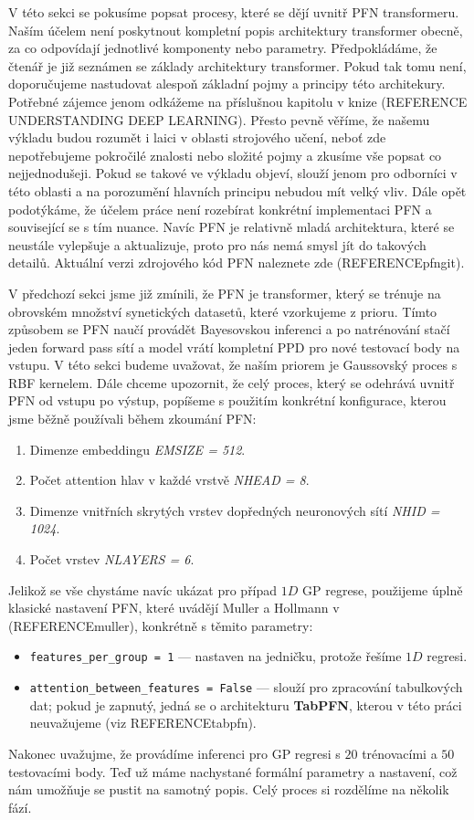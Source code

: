 V této sekci se pokusíme popsat procesy, které se dějí uvnitř PFN transformeru.
Naším účelem není poskytnout kompletní popis architektury transformer obecně, za co odpovídají jednotlivé komponenty nebo parametry.
Předpokládáme, že čtenář je již seznámen se základy architektury transformer.
Pokud tak tomu není, doporučujeme nastudovat alespoň základní pojmy a principy této architekury. 
Potřebné zájemce jenom odkážeme na příslušnou kapitolu v knize (REFERENCE UNDERSTANDING DEEP LEARNING).
Přesto pevně věříme, že našemu výkladu budou rozumět i laici v oblasti strojového učení, neboť zde nepotřebujeme pokročilé znalosti nebo složité pojmy a zkusíme vše popsat co nejjednodušeji.
Pokud se takové ve výkladu objeví, slouží jenom pro odborníci v této oblasti a na porozumění hlavních principu nebudou mít velký vliv. 
Dále opět podotýkáme, že účelem práce není rozebírat konkrétní implementaci PFN a související se s tím nuance.
Navíc PFN je relativně mladá architektura, které se neustále vylepšuje a aktualizuje, proto pro nás nemá smysl jít do takových detailů.
Aktuální verzi zdrojového kód PFN naleznete zde (REFERENCEpfngit).
\par 


V předchozí sekci jsme již zmínili, že PFN je transformer, který se trénuje na obrovském množství synetických datasetů, které vzorkujeme z prioru.
Tímto způsobem se PFN naučí provádět Bayesovskou inferenci a po natrénování stačí jeden forward pass sítí a model vrátí kompletní PPD pro nové testovací body na vstupu. 
V této sekci budeme uvažovat, že naším priorem je Gaussovský proces s RBF kernelem.
Dále chceme upozornit, že celý proces, který se odehrává uvnitř PFN od vstupu po výstup, popíšeme s použitím konkrétní konfigurace, kterou jsme běžně používali během zkoumání PFN:
\begin{enumerate}
    \item Dimenze embeddingu \textit{EMSIZE = 512}.
    \item Počet attention hlav v každé vrstvě \textit{NHEAD = 8}. 
    \item Dimenze vnitřních skrytých vrstev dopředných neuronových sítí \textit{NHID = 1024}.
    \item Počet vrstev \textit{NLAYERS = 6}.
\end{enumerate}
Jelikož se vše chystáme navíc ukázat pro případ $1D$ GP regrese, použijeme úplně klasické nastavení PFN, které uvádějí Muller a Hollmann v (REFERENCEmuller), konkrétně s těmito parametry:
\begin{itemize}
    \item \lstinline|features_per_group = 1| — nastaven na jedničku, protože řešíme $1D$ regresi.
    \item \lstinline|attention_between_features = False| — slouží pro zpracování tabulkových dat; pokud je zapnutý, jedná se o architekturu \textbf{TabPFN}, kterou v této práci neuvažujeme (viz REFERENCEtabpfn).
\end{itemize}
Nakonec uvažujme, že provádíme inferenci pro GP regresi s $20$ trénovacími a $50$ testovacími body. 
Teď už máme nachystané formální parametry a nastavení, což nám umožňuje se pustit na samotný popis.
Celý proces si rozdělíme na několik fází.

